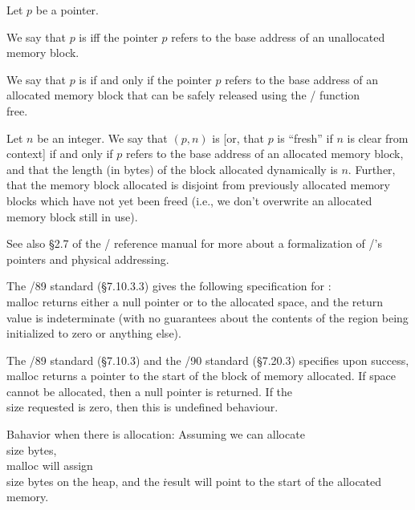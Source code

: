 \fi

\enspace\ignorespaces%
Let $p$ be a pointer.

We say that $p$ is  iff the
pointer $p$ refers to the base address of an unallocated memory block.

We say that $p$ is  if and only if the pointer $p$
refers to the base address of an allocated memory block that can be
safely released using the \CEE/ function \\{free}.

Let $n$ be an integer.
We say that $(p,n)$ is  [or, that $p$ is ``fresh'' if
$n$ is clear from context] if and only if $p$ refers to the base
address of an allocated memory block, and that the length (in bytes)
of the block allocated dynamically is $n$. Further, that the memory
block allocated is disjoint from previously allocated memory blocks
which have not yet been freed (i.e., we don't overwrite an allocated
memory block still in use).

\medskip
See also \S2.7 of the \ACSL/ reference manual for more about a
formalization of \CEE/'s pointers and physical addressing.

\fi

The \CEE/89 standard (\S7.10.3.3) gives the following specification
for : \\{malloc} returns either a null
pointer or
to the allocated space, and the return value is indeterminate (with no
guarantees about the contents of the region being initialized to zero
or anything else).

The \CEE/89 standard (\S7.10.3) and the \CEE/90 standard (\S7.20.3)
specifies upon success, \\{malloc}
returns a pointer to the start of the block of memory allocated. If
space cannot be allocated, then a null pointer is returned. If
the \\{size} requested is zero, then this is undefined behaviour.

\bull Bahavior when there is allocation: Assuming we can allocate \\{size}
bytes,
\\{malloc} will assign \\{size} bytes on the heap, and the \.{result}
will point to the start of the allocated memory.

